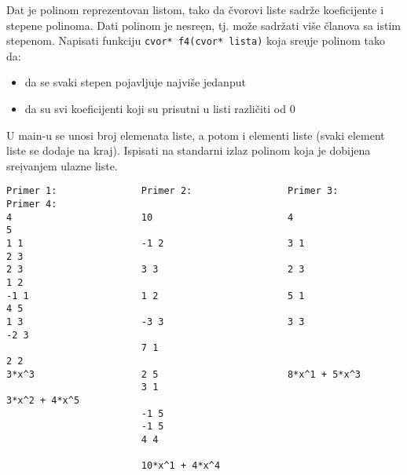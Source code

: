\begin{z}
Dat je polinom reprezentovan listom, tako da \v cvorovi liste sadr\v ze koeficijente i stepene polinoma.
Dati polinom je nesre\d en, tj. mo\v ze sadr\v zati vi\v se \v clanova sa istim stepenom.
Napisati funkciju \verb|cvor* f4(cvor* lista)| koja sre\d uje polinom tako da:
\begin{itemize}
\item da se svaki stepen pojavljuje najvi\v se jedanput
\item da su svi koeficijenti koji su prisutni u listi razli\v citi od 0
\end{itemize}
U main-u se unosi broj elemenata liste, a potom i elementi liste
(svaki element liste se dodaje na kraj).
Ispisati na standarni izlaz polinom koja je dobijena sre\d ivanjem ulazne liste.
\end{z}
\begin{verbatim}
Primer 1:               Primer 2:                 Primer 3:            Primer 4:
4                       10                        4                    5
1 1                     -1 2                      3 1                  2 3
2 3                     3 3                       2 3                  1 2
-1 1                    1 2                       5 1                  4 5
1 3                     -3 3                      3 3                  -2 3
                        7 1                                            2 2
3*x^3                   2 5                       8*x^1 + 5*x^3
                        3 1                                            3*x^2 + 4*x^5
                        -1 5
                        -1 5
                        4 4

                        10*x^1 + 4*x^4
\end{verbatim}

